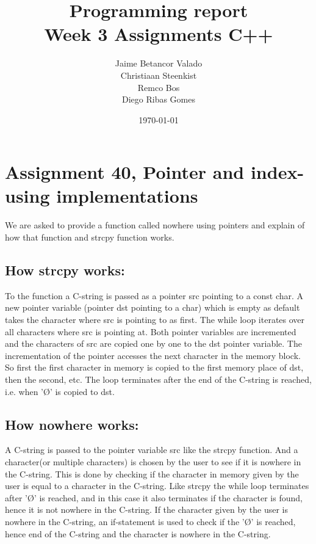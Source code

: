 \documentclass[11pt]{article}
\begin{document}
\title{Programming report \\
       Week 3 Assignments C++
}
\date{\today}
\author{Jaime Betancor Valado \\
Christiaan Steenkist \\
Remco Bos \\
Diego Ribas Gomes
}

\maketitle

\section*{Assignment 40, Pointer and index-using implementations}
We are asked to provide a function called nowhere using pointers and explain of how that function and strcpy function works.
\subsection*{How strcpy works:}
To the function a C-string is passed as a pointer src pointing to a const char. A new pointer variable (pointer dst pointing to a char) which is empty as default takes the character where src is pointing to as first. The while loop iterates over all characters where src is pointing at. Both pointer variables are incremented and the characters of src are copied one by one to the dst pointer variable. The incrementation of the pointer accesses the next character in the memory block. So first the first character in memory is copied to the first memory place of dst, then the second, etc. The loop terminates after the end of the C-string is reached, i.e. when '\O' is copied to dst.
\subsection*{How nowhere works:}
A C-string is passed to the pointer variable src like the strcpy function.
And a character(or multiple characters) is chosen by the user to see if it is
nowhere in the C-string.
This is done by checking if the character in memory given by the user is equal
to a character in the C-string. Like strcpy the while loop terminates after '\O'
is reached, and in this case it also terminates if the character is found, hence it
is not nowhere in the C-string. If the character given by the user is nowhere in the
C-string, an if-statement is used to check if the '\O' is reached, hence end of the
C-string and the character is nowhere in the C-string.
\end{document}
